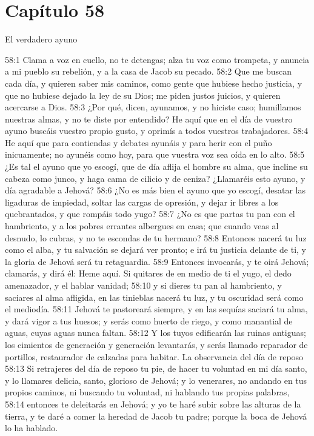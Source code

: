 \section*{Capítulo 58 }
El verdadero ayuno 
 
58:1 Clama a voz en cuello, no te detengas; alza tu voz como trompeta, y anuncia a mi pueblo su rebelión, y a la casa de Jacob su pecado. 
58:2 Que me buscan cada día, y quieren saber mis caminos, como gente que hubiese hecho justicia, y que no hubiese dejado la ley de su Dios; me piden justos juicios, y quieren acercarse a Dios. 
58:3 ¿Por qué, dicen, ayunamos, y no hiciste caso; humillamos nuestras almas, y no te diste por entendido? He aquí que en el día de vuestro ayuno buscáis vuestro propio gusto, y oprimís a todos vuestros trabajadores. 
58:4 He aquí que para contiendas y debates ayunáis y para herir con el puño inicuamente; no ayunéis como hoy, para que vuestra voz sea oída en lo alto. 
58:5 ¿Es tal el ayuno que yo escogí, que de día aflija el hombre su alma, que incline su cabeza como junco, y haga cama de cilicio y de ceniza? ¿Llamaréis esto ayuno, y día agradable a Jehová? 
58:6 ¿No es más bien el ayuno que yo escogí, desatar las ligaduras de impiedad, soltar las cargas de opresión, y dejar ir libres a los quebrantados, y que rompáis todo yugo? 
58:7 ¿No es que partas tu pan con el hambriento, y a los pobres errantes albergues en casa; que cuando veas al desnudo, lo cubras, y no te escondas de tu hermano? 
58:8 Entonces nacerá tu luz como el alba, y tu salvación se dejará ver pronto; e irá tu justicia delante de ti, y la gloria de Jehová será tu retaguardia. 
58:9 Entonces invocarás, y te oirá Jehová; clamarás, y dirá él: Heme aquí. Si quitares de en medio de ti el yugo, el dedo amenazador, y el hablar vanidad; 
58:10 y si dieres tu pan al hambriento, y saciares al alma afligida, en las tinieblas nacerá tu luz, y tu oscuridad será como el mediodía. 
58:11 Jehová te pastoreará siempre, y en las sequías saciará tu alma, y dará vigor a tus huesos; y serás como huerto de riego, y como manantial de aguas, cuyas aguas nunca faltan. 
58:12 Y los tuyos edificarán las ruinas antiguas; los cimientos de generación y generación levantarás, y serás llamado reparador de portillos, restaurador de calzadas para habitar. 
La observancia del día de reposo 
58:13 Si retrajeres del día de reposo tu pie, de hacer tu voluntad en mi día santo, y lo llamares delicia, santo, glorioso de Jehová; y lo venerares, no andando en tus propios caminos, ni buscando tu voluntad, ni hablando tus propias palabras, 
58:14 entonces te deleitarás en Jehová; y yo te haré subir sobre las alturas de la tierra, y te daré a comer la heredad de Jacob tu padre; porque la boca de Jehová lo ha hablado. 
